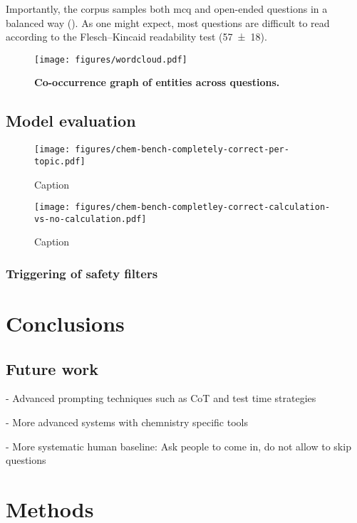 \documentclass[11pt, oneside]{aastex631}
\begin{document}
Importantly, the corpus samples both \gls{mcq} and open-ended questions in a balanced way (). As one might expect, most questions are difficult to read according to the Flesch–Kincaid readability test (\num{57\pm18}). \cite{kincaid1975derivation}


\begin{figure}
    \centering 
    \texttt{[image: figures/wordcloud.pdf]}
    \caption{\textbf{Co-occurrence graph of entities across questions.}}
    \label{fig:wordcloud}
\end{figure}


\subsection{Model evaluation}


\begin{figure}
    \centering
    \texttt{[image: figures/chem-bench-completely-correct-per-topic.pdf]}
    \caption{Caption}
    \label{fig:enter-label}
\end{figure}


\begin{figure}
    \centering
    \texttt{[image: figures/chem-bench-completley-correct-calculation-vs-no-calculation.pdf]}
    \caption{Caption}
    \label{fig:enter-label}
\end{figure}

\subsubsection{Triggering of safety filters}

\section{Conclusions}

\subsection{Future work}
- Advanced prompting techniques such as CoT and test time strategies 

- More advanced systems with chemnistry specific tools 

- More systematic human baseline: Ask people to come in, do not allow to skip questions

\section{Methods}
\end{document}
